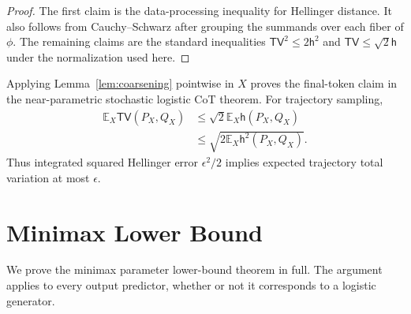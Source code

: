 \documentclass[twoside]{article}
\newcommand{\E}{\mathbb E}
\newcommand{\h}{\mathsf h}
\newcommand{\TV}{\mathsf{TV}}
\begin{document}
\begin{proof}
The first claim is the data-processing inequality for Hellinger distance. It also follows from Cauchy--Schwarz after grouping the summands over each fiber of $\phi$. The remaining claims are the standard inequalities $\TV^2\leq2\h^2$ and $\TV\leq\sqrt2\h$ under the normalization used here.
\end{proof}

Applying Lemma~\ref{lem:coarsening} pointwise in $X$ proves the final-token claim in the near-parametric stochastic logistic CoT theorem. For trajectory sampling,
\begin{align*}
 \E_X\TV(P_X,Q_X)
 &\leq\sqrt2\E_X\h(P_X,Q_X)\\
 &\leq\sqrt{2\E_X\h^2(P_X,Q_X)}.
\end{align*}
Thus integrated squared Hellinger error $\epsilon^2/2$ implies expected trajectory total variation at most $\epsilon$.

\section{Minimax Lower Bound}
\label{app:lower}

We prove the minimax parameter lower-bound theorem in full. The argument applies to every output predictor, whether or not it corresponds to a logistic generator.
\end{document}
